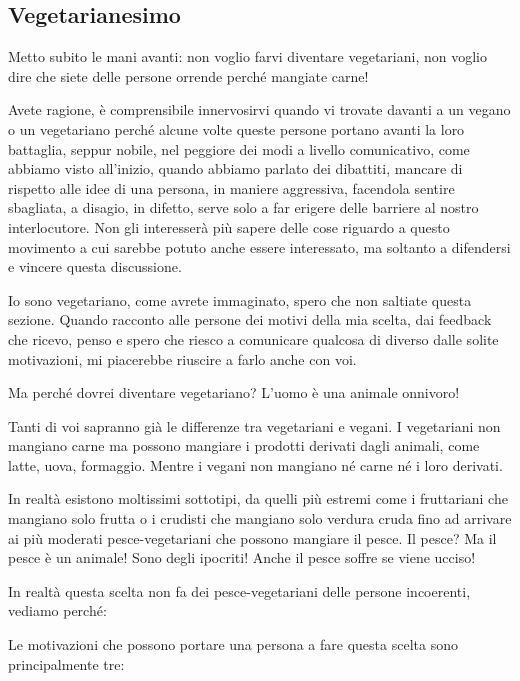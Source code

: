 \documentclass[12pt]{book} %
\begin{document}
\bigskip

\subsection{Vegetarianesimo}
Metto subito le mani avanti: non voglio farvi diventare vegetariani, non voglio dire che siete delle persone orrende
perché mangiate carne!

Avete ragione, è comprensibile innervosirvi quando vi trovate davanti a un vegano o un vegetariano perché alcune volte
queste persone portano avanti la loro battaglia, seppur nobile, nel peggiore dei modi a livello comunicativo, come
abbiamo visto all'inizio, quando abbiamo parlato dei dibattiti, mancare di rispetto alle idee di
una persona, in maniere aggressiva, facendola sentire sbagliata, a disagio, in difetto, serve solo a far erigere delle
barriere al nostro interlocutore. Non gli interesserà più sapere delle cose riguardo a questo movimento a cui sarebbe
potuto anche essere interessato, ma soltanto a difendersi e vincere questa discussione.


\bigskip

Io sono vegetariano, come avrete immaginato, spero che non saltiate questa sezione. Quando racconto alle persone dei
motivi della mia scelta, dai feedback che ricevo, penso e spero che riesco a comunicare qualcosa di diverso dalle
solite motivazioni, mi piacerebbe riuscire a farlo anche con voi. 


\bigskip

Ma perché dovrei diventare vegetariano? L'uomo è una animale onnivoro!

Tanti di voi sapranno già le differenze tra vegetariani e vegani. I vegetariani non mangiano carne ma possono mangiare i
prodotti derivati dagli animali, come latte, uova, formaggio. Mentre i vegani non mangiano né carne né i loro derivati.

In realtà esistono moltissimi sottotipi, da quelli più estremi come i fruttariani che mangiano solo frutta o i crudisti
che mangiano solo verdura cruda fino ad arrivare ai più moderati pesce-vegetariani che possono mangiare il pesce. Il
pesce? Ma il pesce è un animale! Sono degli ipocriti! Anche il pesce soffre se viene ucciso! 

In realtà questa scelta non fa dei pesce-vegetariani delle persone incoerenti, vediamo perché:


\bigskip

Le motivazioni che possono portare una persona a fare questa scelta sono principalmente tre:
\end{document}
